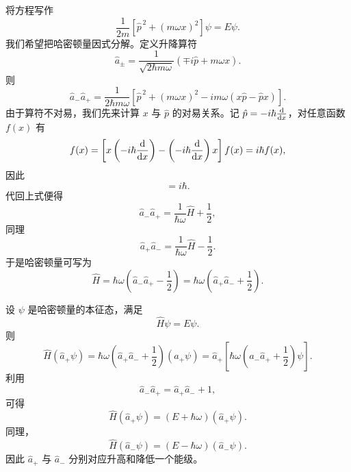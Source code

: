 将方程写作
\begin{equation}
    \frac{1}{2m}\left[ \hat{p}^{\,2}+\left( m\omega x \right)^2 \right]\psi=E\psi.
\end{equation}
我们希望把哈密顿量因式分解。定义升降算符
\begin{equation}
    \hat{a}_\pm
    =
    \frac{1}{\sqrt{2\hbar m\omega}}
    \left( \mp i\hat{p}+m\omega x \right).
\end{equation}
则
\begin{equation}
    \hat{a}_-\hat{a}_+
    =
    \frac{1}{2\hbar m\omega}
    \left[ \hat{p}^{\,2}+\left( m\omega x \right)^2-i m\omega\left( x\hat{p}-\hat{p}x \right) \right].
\end{equation}
由于算符不对易，我们先来计算 \(x\) 与 \(\hat{p}\) 的对易关系。记 \(\hat{p}=-i\hbar \dv{x}\)，对任意函数 \(f(x)\) 有
\begin{equation}
    [x,\hat{p}]f(x)
    =
    \left[ x\left( -i\hbar \dv{x} \right)-\left( -i\hbar \dv{x} \right)x \right]f(x)
    =
    i\hbar f(x),
\end{equation}
因此
\begin{equation}
    [x,\hat{p}]=i\hbar.
\end{equation}
代回上式便得
\begin{equation}
    \hat{a}_-\hat{a}_+
    =
    \frac{1}{\hbar \omega}\hat{H}+\frac{1}{2},
\end{equation}
同理
\begin{equation}
    \hat{a}_+\hat{a}_-
    =
    \frac{1}{\hbar \omega}\hat{H}-\frac{1}{2}.
\end{equation}
于是哈密顿量可写为
\begin{equation}
    \hat{H}
    =
    \hbar\omega\left( \hat{a}_-\hat{a}_+-\frac{1}{2} \right)
    =
    \hbar\omega\left( \hat{a}_+\hat{a}_-+\frac{1}{2} \right).
\end{equation}

设 \(\psi\) 是哈密顿量的本征态，满足
\begin{equation}
    \hat{H}\psi=E\psi.
\end{equation}
则
\begin{equation}
    \hat{H}\left( \hat{a}_+\psi \right)
    =
    \hbar\omega\left( \hat{a}_+\hat{a}_-+\frac{1}{2} \right)\left( \hat{a}_+\psi \right)
    =
    \hat{a}_+\left[ \hbar\omega\left( \hat{a}_-\hat{a}_++\frac{1}{2} \right)\psi \right].
\end{equation}
利用
\begin{equation}
    \hat{a}_-\hat{a}_+
    =
    \hat{a}_+\hat{a}_-+1,
\end{equation}
可得
\begin{equation}
    \hat{H}\left( \hat{a}_+\psi \right)=\left( E+\hbar\omega \right)\left( \hat{a}_+\psi \right).
\end{equation}
同理，
\begin{equation}
    \hat{H}\left( \hat{a}_-\psi \right)=\left( E-\hbar\omega \right)\left( \hat{a}_-\psi \right).
\end{equation}
因此 \(\hat{a}_+\) 与 \(\hat{a}_-\) 分别对应升高和降低一个能级。

